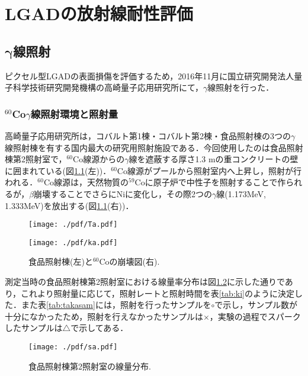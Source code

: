 \chapter{LGADの放射線耐性評価}
\label{chap:tolerance}
\section{$\boldsymbol\gamma$線照射}
ピクセル型LGADの表面損傷を評価するため，2016年11月に国立研究開発法人量子科学技術研究開発機構の高崎量子応用研究所にて，$\gamma$線照射を行った．
\subsection{$^{60}$Co$\gamma$線照射環境と照射量}
高崎量子応用研究所は，コバルト第1棟・コバルト第2棟・食品照射棟の3つの$\gamma$線照射棟を有する国内最大の研究用照射施設である．今回使用したのは食品照射棟第2照射室で，$^{60}$Co線源からの$\gamma$線を遮蔽する厚さ1.3 mの重コンクリートの壁に囲まれている(図\ref{fig:Taka}(左))．$^{60}$Co線源がプールから照射室内へ上昇し，照射が行われる．$^{60}$Co線源は，天然物質の$^{59}$Coに原子炉で中性子を照射することで作られるが，$\beta$崩壊することでさらにNiに変化し，その際2つの$\gamma$線(1.173MeV, 1.333MeV)を放出する(図\ref{fig:Taka}(右))．\par
\begin{figure}[H]
\begin{minipage}{0.5\hsize}
	\centering
	\texttt{[image: ./pdf/Ta.pdf]}
 \end{minipage}
 \begin{minipage}{0.5\hsize}
	\centering
	\texttt{[image: ./pdf/ka.pdf]}
 \end{minipage}
 	\caption{食品照射棟\cite{gamma}(左)と$^{60}$Coの崩壊図(右).}
	\label{fig:Taka}
\end{figure}
測定当時の食品照射棟第2照射室における線量率分布は図\ref{fig:sa}に示した通りであり，これより照射量に応じて，照射レートと照射時間を表\ref{tab:ki}のように決定した．また表\ref{tab:takasam}には，照射を行ったサンプルを$\circ$で示し，サンプル数が十分になかったため，照射を行えなかったサンプルは$\times$，実験の過程でスパークしたサンプルは{\scriptsize$\triangle$}で示してある．
\begin{figure}[H]
	\centering
	\texttt{[image: ./pdf/sa.pdf]}
	\caption{食品照射棟第2照射室の線量分布.}
	\label{fig:sa}
\end{figure}
